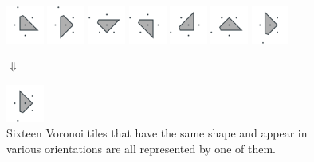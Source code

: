 \documentclass[text.tex]{subfiles}
\begin{document}
\begin{figure}[h!]
\includegraphics[width=0.11\textwidth]{img/results/tiles/octagon_100000_(1_0alpha_1)_026.pdf}
\includegraphics[width=0.11\textwidth]{img/results/tiles/octagon_100000_(1_0alpha_1)_027.pdf}
\includegraphics[width=0.11\textwidth]{img/results/tiles/octagon_100000_(1_0alpha_1)_028.pdf}
\includegraphics[width=0.11\textwidth]{img/results/tiles/octagon_100000_(1_0alpha_1)_029.pdf}
\includegraphics[width=0.11\textwidth]{img/results/tiles/octagon_100000_(1_0alpha_1)_030.pdf}
\includegraphics[width=0.11\textwidth]{img/results/tiles/octagon_100000_(1_0alpha_1)_031.pdf}
\includegraphics[width=0.11\textwidth]{img/results/tiles/octagon_100000_(1_0alpha_1)_032.pdf}

$\Downarrow$

\includegraphics[width=0.11\textwidth]{img/results/tiles/octagon_100000_(1_0alpha_1)_pick.pdf}
\caption{Sixteen Voronoi tiles that have the same shape and appear in various orientations are all represented by one of them. }
\label{fig_results_tiles}
\end{figure}
\end{document}
